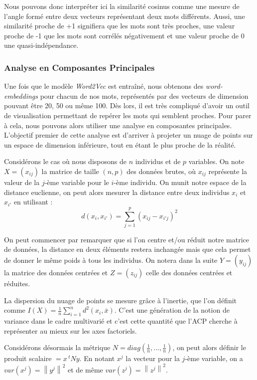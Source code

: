 \documentclass[11pt,french,french]{article}
\begin{document}
Nous pouvons donc interpréter ici la similarité cosinus comme une mesure
de l'angle formé entre deux vecteurs représentant deux mots différents.
Aussi, une similarité proche de +1 signifiera que les mots sont très
proches, une valeur proche de -1 que les mots sont corrélés négativement
et une valeur proche de 0 une quasi-indépendance.

\subsubsection{Analyse en Composantes
Principales}\label{analyse-en-composantes-principales}

Une fois que le modèle \emph{Word2Vec} est entraîné, nous obtenons des
\emph{word-embeddings} pour chacun de nos mots, représentés par des
vecteurs de dimension pouvant être 20, 50 ou même 100. Dès lors, il est
très compliqué d'avoir un outil de visualisation permettant de repérer
les mots qui semblent proches. Pour parer à cela, nous pouvons alors
utiliser une analyse en composantes principales. L'objectif premier de
cette analyse est d'arriver à projeter un nuage de points sur un espace
de dimension inférieure, tout en étant le plus proche de la réalité.

Considérons le cas où nous disposons de \(n\) individus et de \(p\)
variables. On note \(X = (x_{ij})\) la matrice de taille \((n,p)\) des
données brutes, où \(x_{ij}\) représente la valeur de la \(j\)-ème
variable pour le \(i\)-ème individu. On munit notre espace de la
distance euclienne, on peut alors mesurer la distance entre deux
individus \(x_i\) et \(x_{i'}\) en utilisant :
\[d(x_i,x_{i'}) = \sum \limits_{j=1}^p (x_{ij} - x_{i'j})^2 \]

On peut commencer par remarquer que si l'on centre et/ou réduit notre
matrice de données, la distance en deux éléments restera inchangée mais
que cela permet de donner le même poids à tous les individus. On notera
dans la suite \(Y = (y_{ij})\) la matrice des données centrées et
\(Z = (z_{ij})\) celle des données centrées et réduites.

La dispersion du nuage de points se mesure grâce à l'inertie, que l'on
définit comme
\(I(X) = \frac{1}{n} \sum \limits_{i = 1}^n d^2(x_i,\bar{x})\). C'est
une génération de la notion de variance dans le cadre multivarié et
c'est cette quantité que l'ACP cherche à représenter au mieux sur les
axes factoriels.

Considérons désormais la métrique
\(N = diag(\frac{1}{n},...,\frac{1}{n})\), on peut alors définir le
produit scalaire \(<x,y> = x\,^t N y\). En notant \(x^j\) la vecteur
pour la \(j\)-ème variable, on a \(var(x^j) = \left\| y^j \right\|^2\)
et de même \(var(z^j) = \left\| z^j \right\|^2\).
\end{document}
